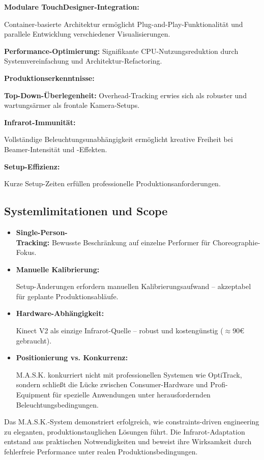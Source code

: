 \textbf{Modulare TouchDesigner-Integration:} \raggedright Container-basierte Architektur ermöglicht Plug-and-Play-Funktionalität und parallele Entwicklung verschiedener Visualisierungen.

\textbf{Performance-Optimierung:} Signifikante CPU-Nutzungsreduktion durch Systemvereinfachung und Architektur-Refactoring.

\textbf{Produktionserkenntnisse:}

\textbf{Top-Down-Überlegenheit:} Overhead-Tracking erwies sich als robuster und wartungsärmer als frontale Kamera-Setups.

\textbf{Infrarot-Immunität:} \raggedright Vollständige Beleuchtungsunabhängigkeit ermöglicht kreative Freiheit bei Beamer-Intensität und -Effekten.

\textbf{Setup-Effizienz:} \raggedright Kurze Setup-Zeiten erfüllen professionelle Produktionsanforderungen.

\subsection{Systemlimitationen und Scope}

\begin{itemize}
    \item \textbf{Single-Person-\\Tracking:} Bewusste Beschränkung auf einzelne Performer für Choreographie-Fokus.
    \item \textbf{Manuelle Kalibrierung:} \raggedright Setup-Änderungen erfordern manuellen Kalibrierungsaufwand – akzeptabel für geplante Produktionsabläufe.
    \item \textbf{Hardware-Abhängigkeit:} \raggedright Kinect V2 als einzige Infrarot-Quelle – robust und kostengünstig ($\approx$90€ gebraucht).
    \item \textbf{Positionierung vs. Konkurrenz:} \raggedright M.A.S.K. konkurriert nicht mit professionellen Systemen wie OptiTrack, sondern schließt die Lücke zwischen Consumer-Hardware und Profi-Equipment für spezielle Anwendungen unter herausfordernden Beleuchtungsbedingungen.
\end{itemize}

Das M.A.S.K.-System demonstriert erfolgreich, wie constraints-driven engineering zu eleganten, produktionstauglichen Lösungen führt. Die Infrarot-Adaptation entstand aus praktischen Notwendigkeiten und beweist ihre Wirksamkeit durch fehlerfreie Performance unter realen Produktionsbedingungen.